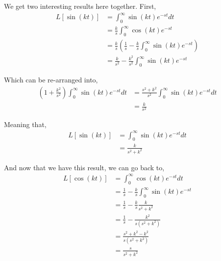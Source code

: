 We get two interesting results here together.
First,
\begin{align*}
L[ \sin(kt) ] &= \int_{0}^{\infty} \sin(kt) e^{-st} dt \\
&= \frac{k}{s} \int_{0}^{\infty} \cos (kt) e^{-st} \\
&= \frac{k}{s} \left( \frac{1}{s} - \frac{k}{s} \int_{0}^{\infty} \sin (kt) e^{-st} \right) \\
&= \frac{k}{s^2} - \frac{k^2}{s^2} \int_{0}^{\infty} \sin (kt) e^{-st}
\end{align*}

Which can be re-arranged into,
\begin{align*}
\left( 1 + \frac{k^2}{s^2} \right) \int_{0}^{\infty} \sin(kt) e^{-st} dt 
&= \frac{s^2 + k^2}{s^2} \int_{0}^{\infty} \sin(kt) e^{-st} dt \\
&= \frac{k}{s^2}
\end{align*}

Meaning that,
\begin{align*}
L[ \sin(kt) ] &= \int_{0}^{\infty} \sin(kt) e^{-st} dt \\
&= \frac{k}{s^2 + k^2}
\end{align*}

And now that we have this result, we can go back to,
\begin{align*}
L[ \cos(kt) ] &= \int_{0}^{\infty} \cos(kt) e^{-st} dt \\
&= \frac{1}{s} - \frac{k}{s} \int_{0}^{\infty} \sin (kt) e^{-st} \\
&= \frac{1}{s} - \frac{k}{s} \frac{k}{s^2 + k^2} \\
&= \frac{1}{s}  - \frac{k^2}{s(s^2 + k^2)} \\
&= \frac{s^2 + k^2  - k^2}{s(s^2 + k^2)} \\
&= \frac{s}{s^2 + k^2}
\end{align*}